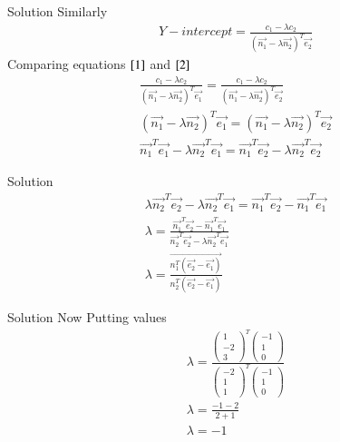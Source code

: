 \documentclass{beamer}
\begin{document}
\begin{frame}{Solution}
Similarly
\begin{align}
    Y-intercept=\frac{c_1-\lambda c_2}{(\vec{n_1}-\lambda \vec{n_2})^T\vec{e_2}} \label{2}
\end{align}
Comparing equations $\eqref{1}$ and $\eqref{2}$
\begin{align}
    \frac{c_1-\lambda c_2}{(\vec{n_1}-\lambda \vec{n_2})^T\vec{e_1}}=\frac{c_1-\lambda c_2}{(\vec{n_1}-\lambda \vec{n_2})^T\vec{e_2}}\\
    (\vec{n_1}-\lambda \vec{n_2})^T\vec{e_1}=(\vec{n_1}-\lambda \vec{n_2})^T\vec{e_2}\\
    \vec{n_1}^T\vec{e_1}-\lambda\vec{n_2}^T\vec{e_1}=\vec{n_1}^T\vec{e_2}-\lambda\vec{n_2}^T\vec{e_2}
\end{align}
    \end{frame}
\begin{frame}{Solution}
\begin{align}
    \lambda\vec{n_2}^T\vec{e_2}-\lambda\vec{n_2}^T\vec{e_1}=\vec{n_1}^T\vec{e_2}-\vec{n_1}^T\vec{e_1}\\
    \lambda=\frac{\vec{n_1}^T\vec{e_2}-\vec{n_1}^T\vec{e_1}}{\vec{n_2}^T\vec{e_2}-\lambda\vec{n_2}^T\vec{e_1}}\\
    \lambda=\frac{\vec{n_1^T(\vec{e_2}-\vec{e_1})}}{n_2^T(\vec{e_2}-\vec{e_1})}
\end{align}
    \end{frame}
\begin{frame}{Solution}
Now Putting values
\begin{align}
    \lambda=\frac{\begin{pmatrix}1\\-2\\3\end{pmatrix}^T\begin{pmatrix}-1\\1\\0\end{pmatrix}}{\begin{pmatrix}-2\\1\\1\end{pmatrix}^T\begin{pmatrix}-1\\1\\0\end{pmatrix}}\\
    \lambda=\frac{-1-2}{2+1}\\
    \lambda=-1
\end{align}
\end{frame}
\end{document}

